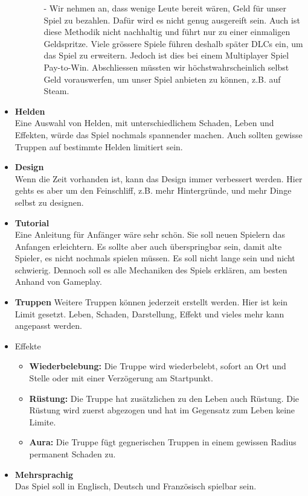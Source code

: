 \begin{itemize}
\begin{enumerate}
\begin{itemize}
            \item[-] Wir nehmen an, dass wenige Leute bereit wären, Geld für unser Spiel zu bezahlen.
                    Dafür wird es nicht genug ausgereift sein.
                    Auch ist diese Methodik nicht nachhaltig und führt nur zu einer einmaligen Geldspritze.
                    Viele grössere Spiele führen deshalb später
                    DLCs ein, um das Spiel zu erweitern.
                    Jedoch ist dies bei einem Multiplayer Spiel Pay-to-Win.
                    Abschliessen müssten wir höchstwahrscheinlich selbst Geld vorauswerfen, um unser Spiel anbieten zu können, z.B. auf Steam.
        \end{itemize}
        
    \end{enumerate}
    \item \textbf{Helden} \\
        Eine Auswahl von Helden, mit unterschiedlichem Schaden, Leben und Effekten, würde das Spiel nochmals spannender machen. Auch sollten gewisse Truppen auf bestimmte Helden limitiert sein. 
    \item \textbf{Design} \\
        Wenn die Zeit vorhanden ist, kann das Design immer verbessert werden. Hier gehts es aber um den Feinschliff, z.B. mehr Hintergründe, und mehr Dinge selbst zu designen.
    \item \textbf{Tutorial} \\
        Eine Anleitung für Anfänger wäre sehr schön. Sie soll neuen Spielern das Anfangen erleichtern. Es sollte aber auch überspringbar sein,
        damit alte Spieler, es nicht nochmals spielen müssen. Es soll nicht lange sein und nicht schwierig. Dennoch soll es alle Mechaniken des Spiels
        erklären, am besten Anhand von Gameplay.
    \item \textbf{Truppen}
        Weitere Truppen können jederzeit erstellt werden. Hier ist kein Limit gesetzt. Leben, Schaden, Darstellung, Effekt und vieles mehr kann angepasst werden.
    \item Effekte
    \begin{itemize}
        \item \textbf{Wiederbelebung:}
            Die Truppe wird wiederbelebt, sofort an Ort und Stelle oder mit einer Verzögerung am Startpunkt.
        \item \textbf{Rüstung:}
            Die Truppe hat zusätzlichen zu den Leben auch Rüstung. Die Rüstung wird zuerst abgezogen und hat im Gegensatz zum Leben keine Limite.
        \item \textbf{Aura:}
            Die Truppe fügt gegnerischen Truppen in einem gewissen Radius permanent Schaden zu.
    \end{itemize}
    \item \textbf{Mehrsprachig} \\
        Das Spiel soll in Englisch, Deutsch und Französisch spielbar sein.
\end{itemize}

